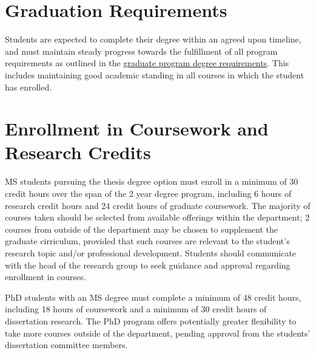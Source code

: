 \documentclass[12pt,a4paper,article,oneside]{memoir} %
\begin{document}



\section{Graduation Requirements}

Students are expected to complete their degree within an agreed upon timeline, and must maintain steady progress towards the fulfillment of all program requirements as outlined in the \href{http://catalog.okstate.edu/engineering-architecture-technology/civil-environmental-engineering/#graduateprogramstext}{graduate program degree requirements}. This includes maintaining good academic standing in all courses in which the student has enrolled. 

\section{Enrollment in Coursework and Research Credits}

MS students pursuing the thesis degree option must enroll in a minimum of 30 credit hours over the span of the 2 year degree program, including 6 hours of research credit hours and 24 credit hours of graduate coursework. The majority of courses taken should be selected from available offerings within the department; 2 courses from outside of the department may be chosen to supplement the graduate cirriculum, provided that such courses are relevant to the student's research topic and/or professional development. Students should communicate with the head of the research group to seek guidance and approval regarding enrollment in courses.

PhD students with an MS degree must complete a minimum of 48 credit hours, including 18 hours of coursework and a minimum of 30 credit hours of dissertation research. The PhD program offers potentially greater flexibility to take more courses outside of the department, pending approval from the students' dissertation committee members.
\end{document}
